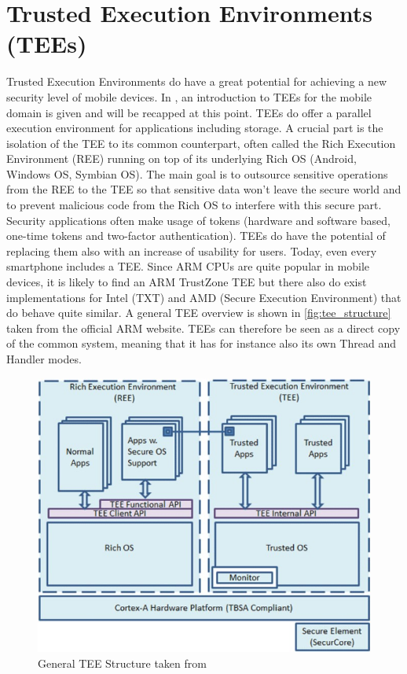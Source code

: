 \chapter{Trusted Execution Environments (TEEs)}\label{chapter:tee}

Trusted Execution Environments do have a great potential for achieving a new
security level of mobile devices. In \parencite{mobile_tee}, an introduction
to TEEs for the mobile domain is given and will be recapped at this point.
TEEs do offer a parallel execution environment for applications including storage. A crucial part is the isolation of the TEE to its common counterpart, often called the Rich Execution Environment (REE) running on top of its underlying Rich OS (Android, Windows OS, Symbian OS). The main goal is to outsource sensitive operations from the REE to the TEE so that sensitive data won't leave
the secure world and to prevent malicious code from the Rich OS to interfere with this secure part. Security applications often make usage of tokens (hardware 
and software based, one-time tokens and two-factor authentication).
TEEs do have the potential of replacing them also with an increase of usability
for users.
Today, even every smartphone includes a TEE. Since ARM CPUs are quite popular in mobile devices, it is likely to find an ARM TrustZone TEE but there also do exist implementations for Intel (TXT) and AMD (Secure Execution Environment) that do behave quite similar.
A general TEE overview is shown in \autoref{fig:tee_structure} taken from the
official ARM website. TEEs can therefore be seen as a direct copy of the common
system, meaning that it has for instance also its own Thread and Handler modes.
\begin{figure}[htb]
  \centering
  \includegraphics[scale=0.6]{figures/TEE_structure}
  \caption[General TEE Structure]{General TEE Structure taken from \parencite{tee_dev}}
  \label{fig:tee_structure}
\end{figure}
